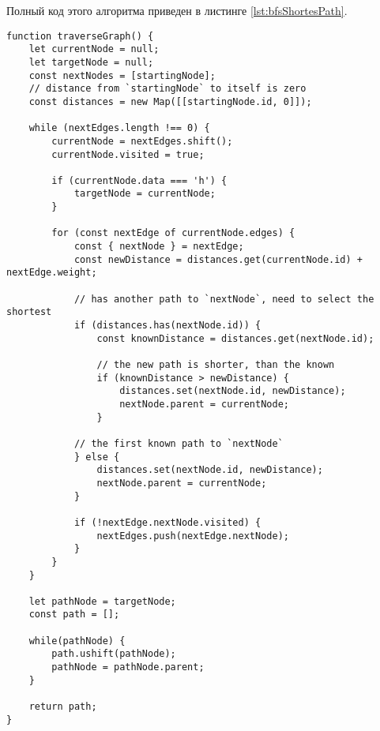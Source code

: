 \documentclass[../article.tex]{subfiles}
\begin{document}
Полный код этого алгоритма приведен в листинге \ref{lst:bfsShortesPath}.

\begin{figure*}[h]
    \begin{ruledelement}
        \begin{lstlisting}[caption={Первый подход к поиску кратчайшего пути}, label={lst:bfsShortestPath}]
function traverseGraph() {
    let currentNode = null;
    let targetNode = null;
    const nextNodes = [startingNode];
    // distance from `startingNode` to itself is zero
    const distances = new Map([[startingNode.id, 0]]);

    while (nextEdges.length !== 0) {
        currentNode = nextEdges.shift();
        currentNode.visited = true;

        if (currentNode.data === 'h') {
            targetNode = currentNode;
        }

        for (const nextEdge of currentNode.edges) {
            const { nextNode } = nextEdge;
            const newDistance = distances.get(currentNode.id) + nextEdge.weight;

            // has another path to `nextNode`, need to select the shortest
            if (distances.has(nextNode.id)) {
                const knownDistance = distances.get(nextNode.id);

                // the new path is shorter, than the known
                if (knownDistance > newDistance) {
                    distances.set(nextNode.id, newDistance);
                    nextNode.parent = currentNode;
                }

            // the first known path to `nextNode`
            } else {
                distances.set(nextNode.id, newDistance);
                nextNode.parent = currentNode;
            }

            if (!nextEdge.nextNode.visited) {
                nextEdges.push(nextEdge.nextNode);
            }
        }
    }

    let pathNode = targetNode;
    const path = [];

    while(pathNode) {
        path.ushift(pathNode);
        pathNode = pathNode.parent;
    }

    return path;
}
        \end{lstlisting}
    \end{ruledelement}

\end{figure*}
\end{document}
